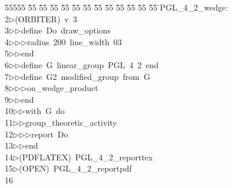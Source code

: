 %
%
\begin{tabbing}
55555 \= 55 \= 55 \= 55 \= 55 \= 55 \= 55 \= 55 \= 55 \= 55 \= 55 \= 55 \= 55 \= \>PGL\_4\_2\_wedge:\\[0pt]
2\>$\triangleright$\>(ORBITER)\ v\ 3\ \\[0pt]
3\>$\triangleright$\>$\triangleright$\>define\ Do\ draw\_options\ \\[0pt]
4\>$\triangleright$\>$\triangleright$\>$\triangleright$\>radius\ 200\ line\_width\ 03\ \\[0pt]
5\>$\triangleright$\>$\triangleright$\>end\ \\[0pt]
6\>$\triangleright$\>$\triangleright$\>define\ G\ linear\_group\ PGL\ 4\ 2\ end\ \\[0pt]
7\>$\triangleright$\>$\triangleright$\>define\ G2\ modified\_group\ from\ G\ \\[0pt]
8\>$\triangleright$\>$\triangleright$\>$\triangleright$\>on\_wedge\_product\ \\[0pt]
9\>$\triangleright$\>$\triangleright$\>end\ \\[0pt]
10\>$\triangleright$\>$\triangleright$\>with\ G\ do\ \\[0pt]
11\>$\triangleright$\>$\triangleright$\>group\_theoretic\_activity\ \\[0pt]
12\>$\triangleright$\>$\triangleright$\>$\triangleright$\>report\ Do\ \\[0pt]
13\>$\triangleright$\>$\triangleright$\>end\\[0pt]
14\>$\triangleright$\>(PDFLATEX)\ PGL\_4\_2\_reporttex\\[0pt]
15\>$\triangleright$\>(OPEN)\ PGL\_4\_2\_reportpdf\\[0pt]
16\>\end{tabbing}
